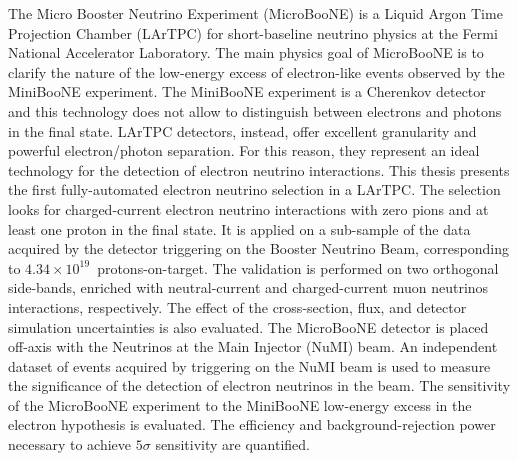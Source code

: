 The Micro Booster Neutrino Experiment (MicroBooNE) is a Liquid Argon Time Projection Chamber (LArTPC) for short-baseline neutrino physics at the Fermi National Accelerator Laboratory. The main physics goal of MicroBooNE is to clarify the nature of the low-energy excess of electron-like events observed by the MiniBooNE experiment.
The MiniBooNE experiment is a Cherenkov detector and this technology does not allow to distinguish between electrons and photons in the final state. 
LArTPC detectors, instead, offer excellent granularity and powerful electron/photon separation. For this reason, they represent an ideal technology for the detection of electron neutrino interactions.
This thesis presents the first fully-automated electron neutrino selection in a LArTPC. The selection looks for charged-current electron neutrino interactions with zero pions and at least one proton in the final state. It is applied on a sub-sample of the data acquired by the detector triggering on the Booster Neutrino Beam, corresponding to $4.34\times10^{19}$~protons-on-target. The validation is performed on two orthogonal side-bands, enriched with neutral-current and charged-current muon neutrinos interactions, respectively. The effect of the cross-section, flux, and detector simulation uncertainties is also evaluated. 
The MicroBooNE detector is placed off-axis with the Neutrinos at the Main Injector (NuMI) beam. An independent dataset of events acquired by triggering on the NuMI beam is used to measure the significance of the detection of electron neutrinos in the beam. 
The sensitivity of the MicroBooNE experiment to the MiniBooNE low-energy excess in the electron hypothesis is evaluated. The efficiency and background-rejection power necessary to achieve $5\sigma$ sensitivity are quantified.